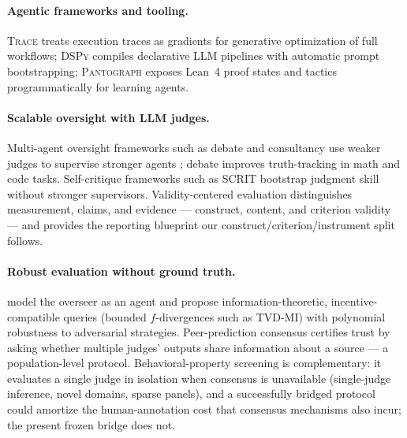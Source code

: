 \documentclass{article}
\begin{document}
\paragraph{Agentic frameworks and tooling.}
\textsc{Trace} \citep{cheng2024trace} treats execution traces as gradients for generative optimization of full workflows; \textsc{DSPy} \citep{khattab2024dspy} compiles declarative LLM pipelines with automatic prompt bootstrapping; \textsc{Pantograph} \citep{aniva2025pantograph} exposes Lean~4 proof states and tactics programmatically for learning agents.

\paragraph{Scalable oversight with LLM judges.}
Multi-agent oversight frameworks such as debate and consultancy use weaker judges to supervise stronger agents \citep{kenton2024oversight,Chan2024ChatEval}; debate improves truth-tracking in math and code tasks.
Self-critique frameworks such as SCRIT \citep{zheng2024scrit} bootstrap judgment skill without stronger supervisors.
Validity-centered evaluation \citep{salaudeen2025measurement} distinguishes measurement, claims, and evidence --- construct, content, and criterion validity --- and provides the reporting blueprint our construct/criterion/instrument split follows.

\paragraph{Robust evaluation without ground truth.}
\citet{robertson2025stepbystep} model the overseer as an agent and propose information-theoretic, incentive-compatible queries (bounded $f$-divergences such as TVD-MI) with polynomial robustness to adversarial strategies.
Peer-prediction consensus certifies trust by asking whether multiple judges' outputs share information about a source --- a population-level protocol.
Behavioral-property screening is complementary: it evaluates a single judge in isolation when consensus is unavailable (single-judge inference, novel domains, sparse panels), and a successfully bridged protocol could amortize the human-annotation cost that consensus mechanisms also incur; the present frozen bridge does not.
\end{document}
